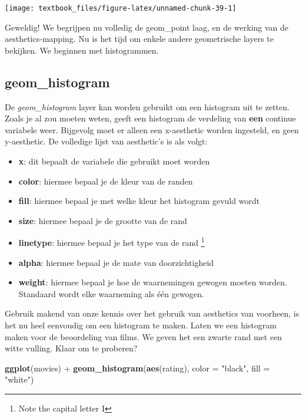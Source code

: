 \documentclass[]{tufte-book}
\newenvironment{Shaded}{}{}
\newcommand{\DataTypeTok}[1]{\textcolor[rgb]{0.56,0.13,0.00}{#1}}
\newcommand{\KeywordTok}[1]{\textcolor[rgb]{0.00,0.44,0.13}{\textbf{#1}}}
\newcommand{\NormalTok}[1]{#1}
\newcommand{\OperatorTok}[1]{\textcolor[rgb]{0.40,0.40,0.40}{#1}}
\newcommand{\StringTok}[1]{\textcolor[rgb]{0.25,0.44,0.63}{#1}}
\providecommand{\tightlist}{%
  \setlength{\itemsep}{0pt}\setlength{\parskip}{0pt}}
\begin{document}
\texttt{[image: textbook\_files/figure-latex/unnamed-chunk-39-1]}

Geweldig! We begrijpen nu volledig de geom\_point laag, en de werking van de aesthetics-mapping. Nu is het tijd om enkele andere geometrische layers te bekijken. We beginnen met histogrammen.

\hypertarget{geom_histogram}{%
\subsection{geom\_histogram}\label{geom_histogram}}

De \emph{geom\_histogram} layer kan worden gebruikt om een histogram uit te zetten. Zoals je al zou moeten weten, geeft een histogram de verdeling van \textbf{een} continue variabele weer. Bijgevolg moet er alleen een x-aesthetic worden ingesteld, en geen y-aesthetic. De volledige lijst van aesthetic's is als volgt:

\begin{itemize}
\tightlist
\item
  \textbf{x}: dit bepaalt de variabele die gebruikt moet worden
\item
  \textbf{color}: hiermee bepaal je de kleur van de randen
\item
  \textbf{fill}: hiermee bepaal je met welke kleur het histogram gevuld wordt
\item
  \textbf{size}: hiermee bepaal je de grootte van de rand
\item
  \textbf{linetype}: hiermee bepaal je het type van de rand \footnote{Note the capital letter I}
\item
  \textbf{alpha}: hiermee bepaal je de mate van doorzichtigheid
\item
  \textbf{weight}: hiermee bepaal je hoe de waarnemingen gewogen moeten worden. Standaard wordt elke waarneming als één gewogen.
\end{itemize}

Gebruik makend van onze kennis over het gebruik van aesthetics van voorheen, is het nu heel eenvoudig om een histogram te maken. Laten we een histogram maken voor de beoordeling van films. We geven het een zwarte rand met een witte vulling. Klaar om te proberen?

\begin{Shaded}
\begin{Highlighting}[]
\KeywordTok{ggplot}\NormalTok{(movies) }\OperatorTok{+}
\StringTok{    }\KeywordTok{geom_histogram}\NormalTok{(}\KeywordTok{aes}\NormalTok{(rating), }\DataTypeTok{color =} \StringTok{"black"}\NormalTok{, }\DataTypeTok{fill =} \StringTok{"white"}\NormalTok{)}
\end{Highlighting}
\end{Shaded}
\end{document}
